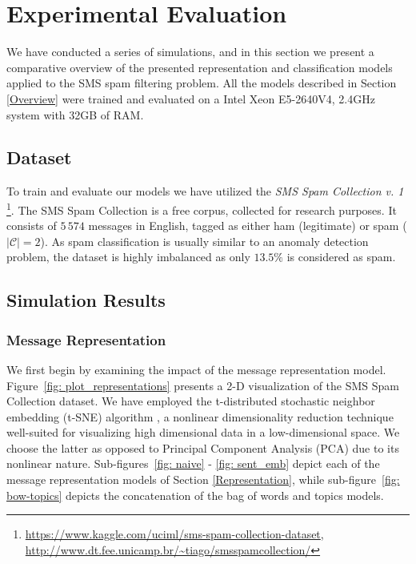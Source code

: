 \documentclass[letterpaper]{article}
\begin{document}
\section{Experimental Evaluation} \label{Experimental Evaluation}

We have conducted a series of simulations, and in this section we present a comparative overview of the presented representation and classification models applied to the SMS spam filtering problem. All the models described in Section \ref{Overview} were trained and evaluated on a Intel Xeon E5-2640V4, 2.4GHz system with 32GB of RAM.

\subsection{Dataset}  \label{Dataset}

To train and evaluate our models we have utilized the \emph{SMS Spam Collection v. 1} \footnote{\url{https://www.kaggle.com/uciml/sms-spam-collection-dataset}, \\ \url{http://www.dt.fee.unicamp.br/~tiago/smsspamcollection/}}. The SMS Spam Collection is a free corpus, collected for research purposes. It consists of $5\,574$ messages in English, tagged as either ham (legitimate) or spam ($|\mathcal{C}| = 2$). As spam classification is usually similar to an anomaly detection problem, the dataset is highly imbalanced as only $13.5\%$ is considered as spam.

\subsection{Simulation Results}  \label{Simulation Results}

\subsubsection{Message Representation}  \label{Representation Results}

We first begin by examining the impact of the message representation model. Figure~\ref{fig: plot_representations} presents a 2-D visualization of the SMS Spam Collection dataset. We have employed the t-distributed stochastic neighbor embedding (t-SNE) algorithm \cite{maaten2008visualizing}, a nonlinear dimensionality reduction technique well-suited for visualizing high dimensional data in a low-dimensional space. We choose the latter as opposed to Principal Component Analysis (PCA) due to its nonlinear nature. Sub-figures~\ref{fig: naive} - \ref{fig: sent_emb} depict each of the message representation models of Section \ref{Representation}, while sub-figure~\ref{fig: bow-topics} depicts the concatenation of the bag of words and topics models.
\end{document}
